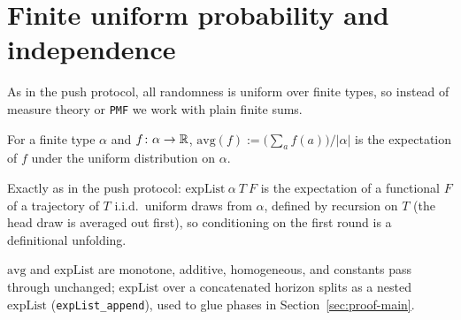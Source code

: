 \section{Finite uniform probability and independence}\label{sec:prelim}

As in the push protocol, all randomness is uniform over finite types, so
instead of measure theory or \texttt{PMF} we work with plain finite sums.

\begin{definition}[Average]\label{def:avg}
  \leanok
  For a finite type $\alpha$ and $f \colon \alpha \to \mathbb{R}$,
  $\mathrm{avg}(f) := \bigl(\sum_a f(a)\bigr)/|\alpha|$ is the expectation of
  $f$ under the uniform distribution on $\alpha$.
\end{definition}

\begin{definition}\label{def:expList}
  \leanok
  Exactly as in the push protocol: $\mathrm{expList}\ \alpha\ T\ F$ is the
  expectation of a functional $F$ of a trajectory of $T$ i.i.d.\ uniform
  draws from $\alpha$, defined by recursion on $T$ (the head draw is
  averaged out first), so conditioning on the first round is a definitional
  unfolding.
\end{definition}

\begin{lemma}\label{lem:avg-basic}
  \leanok
  $\mathrm{avg}$ and $\mathrm{expList}$ are monotone, additive, homogeneous,
  and constants pass through unchanged; $\mathrm{expList}$ over a
  concatenated horizon splits as a nested $\mathrm{expList}$
  (\texttt{expList\_append}), used to glue phases in
  Section~\ref{sec:proof-main}.
\end{lemma}

